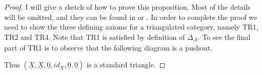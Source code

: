     \begin{proof}
        I will give a sketch of how to prove this proposition. Most of the details will be omitted, and they can be found in \cite{Mat20} or \cite{May01}. In order to complete the proof we need to show the three defining axioms for a triangulated category, namely TR1, TR2 and TR4. Note that TR1 is satisfied by definition of $\Delta_{\underline{\mathcal{A}}}$. To see the final part of TR1 is to observe that the following diagram is a pushout.
        \begin{center}
        \end{center}
        Thus $(\underline{X},\underline{X},\underline{0},id_{\underline{X}},\underline{0},\underline{0})$ is a standard triangle.

        

\end{proof}
